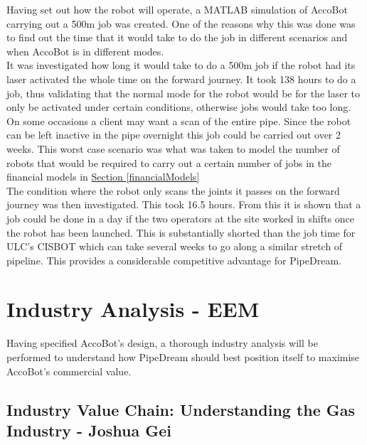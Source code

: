 \documentclass[11pt]{article}		%
\newcommand{\sectref}[1]{\hyperref[#1]{Section \ref*{#1}}}     %
\begin{document}
	    Having set out how the robot will operate, a MATLAB simulation of AccoBot carrying out a 500m job was created. One of the reasons why this was done was to find out the time that it would take to do the job in different scenarios and when AccoBot is in different modes. \\ \hspace*{3ex}
	    It was investigated how long it would take to do a 500m job if the robot had its laser activated the whole time on the forward journey. It took 138 hours to do a job, thus validating that the normal mode for the robot would be for the laser to only be activated under certain conditions, otherwise jobs would take too long. On some occasions a client may want a scan of the entire pipe. Since the robot can be left inactive in the pipe overnight this job could be carried out over 2 weeks. This worst case scenario was what was taken to model the number of robots that would be required to carry out a certain number of jobs in the financial models in \sectref{financialModels}
	    \\
        \hspace*{3ex}The condition where the robot only scans the joints it passes on the forward journey was then investigated. This took 16.5 hours. From this it is shown that a job could be done in a day if the two operators at the site worked in shifts once the robot has been launched. This is substantially shorted than the job time for ULC's CISBOT which can take several weeks to go along a similar stretch of pipeline. This provides a considerable competitive advantage for PipeDream.

	\section{Industry Analysis - EEM}
		
	Having specified AccoBot's design, a thorough industry analysis will be performed to understand how PipeDream should best position itself to maximise AccoBot's commercial value. 
		
		\subsection[Industry Value Chain]{Industry Value Chain: Understanding the Gas Industry - Joshua Gei}\label{valueChainSection}
		
\end{document}
